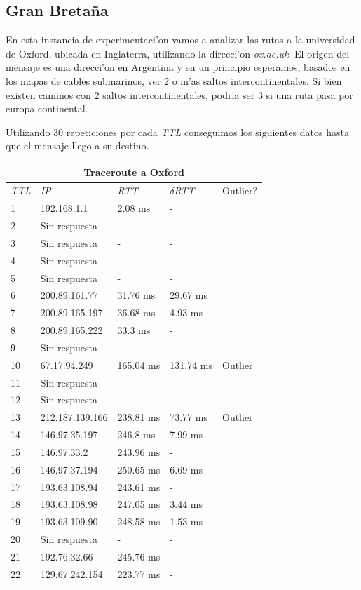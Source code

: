 \subsection{Gran Breta\~na}
En esta instancia de experimentaci'on vamos a analizar las rutas a la universidad de Oxford, ubicada en Inglaterra, utilizando la direcci'on \textit{ox.ac.uk}. 
El origen del mensaje es una direcci'on en Argentina y en un principio esperamos, basados en los mapas de cables submarinos, ver 2 o m'as saltos intercontinentales. Si bien
existen caminos con 2 saltos intercontinentales, podria ser 3 si una ruta pasa por europa continental. 

Utilizando 30 repeticiones por cada \textit{TTL}  conseguimos los siguientes datos hasta que el mensaje llego a su destino.

\begin{tabular}{ |p{1cm}||p{3cm}|p{2cm}|p{2cm}|p{1.5cm}|  }
 \hline
 \multicolumn{5}{|c|}{Traceroute a Oxford} \\
 \hline
 \textit{TTL} & \textit{IP}  & \textit{RTT} & $\delta$\textit{RTT} & Outlier? \\
 \hline
 1   & 192.168.1.1   & 2.08 ms &   - &   \\
 2   & Sin respuesta  & - 	&   - &   \\
 3   & Sin respuesta  & - 	&   - &   \\
 4   & Sin respuesta  & - 	&   - &   \\
 5   & Sin respuesta  & - 	&   - &   \\
 6   & 200.89.161.77  & 31.76 ms &  29.67 ms &   \\
 7   & 200.89.165.197  & 36.68 ms &  4.93 ms &    \\
 8   & 200.89.165.222  & 33.3 ms &  - &   \\
 9   & Sin respuesta  & - &   - &   \\
 10   & 67.17.94.249 & 165.04 ms &  131.74 ms & Outlier \\
 11   & Sin respuesta   & - &   - &   \\
 12   & Sin respuesta   & - &   - &   \\
13   &   212.187.139.166&    238.81 ms  &      73.77 ms  & Outlier  \\    
14   &   146.97.35.197  &    246.8 ms   &      7.99 ms  &   \\       
15   &   146.97.33.2   &     243.96 ms  &      -    &   \\         
16   &   146.97.37.194   &   250.65 ms  &      6.69 ms  &    \\       
17   &   193.63.108.94   &   243.61 ms  &      -   &    \\         
18    &  193.63.108.98   &   247.05 ms    &     3.44 ms   &    \\       
19   &   193.63.109.90  &    248.58 ms  &      1.53 ms  &     \\
20   &   Sin respuesta              &    -          &      -    &   \\   
21   &   192.76.32.66   &    245.76 ms  &      -     &   \\    
22   &   129.67.242.154  &   223.77 ms   &     -   &   \\
 \hline
\end{tabular}

